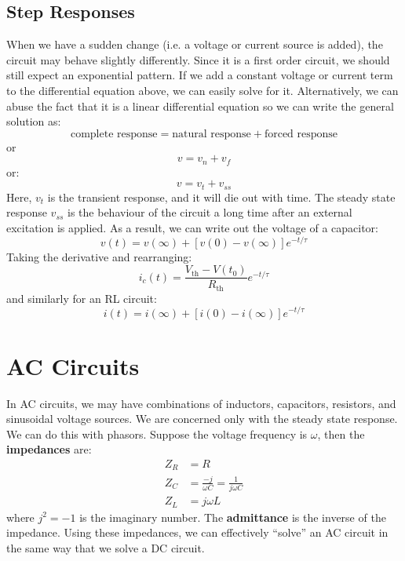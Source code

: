 \documentclass{article}
\begin{document}
\subsection{Step Responses}
When we have a sudden change (i.e. a voltage or current source is added), the circuit may behave slightly differently. Since it is a first order circuit, we should still expect an exponential pattern. If we add a constant voltage or current term to the differential equation above, we can easily solve for it. Alternatively, we can abuse the fact that it is a linear differential equation so we can write the general solution as:
\begin{equation}
    \text{complete response} = \text{natural response} + \text{forced response} 
\end{equation}
or
\begin{equation}
    v = v_n + v_f
\end{equation}
or:
\begin{equation}
    v = v_t + v_{ss}
\end{equation}
Here, $v_t$ is the transient response, and it will die out with time. The steady state response $v_{ss}$ is the behaviour of the circuit a long time after an external excitation is applied. As a result, we can write out the voltage of a capacitor:
\begin{equation}
    \boxed{v(t) = v(\infty) + [v(0)-v(\infty)]e^{-t/\tau}}
\end{equation}
Taking the derivative and rearranging:
\begin{equation}
    i_c(t) = \frac{V_\text{th}-V(t_0)}{R_\text{th}} e^{-t/\tau}
\end{equation}
and similarly for an RL circuit:
\begin{equation}
    \boxed{i(t) = i(\infty) + [i(0) -i(\infty)]e^{-t/\tau}}
\end{equation}
\section{AC Circuits}
In AC circuits, we may have combinations of inductors, capacitors, resistors, and sinusoidal voltage sources. We are concerned only with the steady state response. We can do this with phasors. Suppose the voltage frequency is $\omega$, then the \textbf{impedances} are:
\begin{align}
    Z_R &= R \\ 
    Z_C &= \frac{-j}{\omega C} = \frac{1}{j\omega C} \\ 
    Z_L &= j\omega L
\end{align}
where $j^2=-1$ is the imaginary number. The \textbf{admittance} is the inverse of the impedance. Using these impedances, we can effectively ``solve'' an AC circuit in the same way that we solve a DC circuit.
\end{document}
